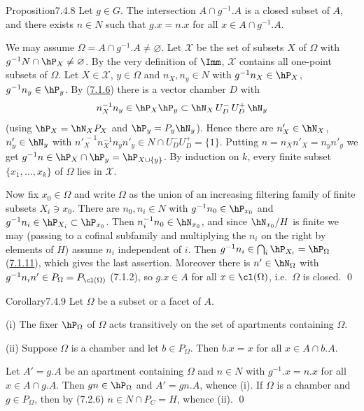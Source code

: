 \documentclass[12pt,a4paper,oneside,english]{smfart}
\makeatletter
\newcommand{\btanchor}[1]{\leavevmode\Hy@raisedlink{\hypertarget{bt:#1}{}}}
\newcommand{\btref}[1]{\hyperlink{bt:#1}{#1}}
\theoremstyle{definition}
\theoremstyle{bt}
\makeatother
\begin{document}
\begin{stmt}{Proposition}{7.4.8}\btanchor{7.4.8}
Let $g\in G$. The intersection $A\cap g^{-1}.A$ is a closed subset of $A$, and there
exists $n\in N$ such that $g.x=n.x$ for all $x\in A\cap g^{-1}.A$.
\end{stmt}

\pf We may assume $\Omega=A\cap g^{-1}.A\neq\varnothing$. Let $\mathscr{X}$ be the
set of subsets $X$ of $\Omega$ with $g^{-1}N\cap\hP_X\neq\varnothing$. By the very
definition of $\Imm$, $\mathscr{X}$ contains all one-point subsets of $\Omega$. Let
$X\in\mathscr{X}$, $y\in\Omega$ and $n_X,n_y\in N$ with $g^{-1}n_X\in\hP_X$,
$g^{-1}n_y\in\hP_y$. By (\btref{7.1.6}) there is a vector chamber $D$ with
\[
  n_X^{-1}n_y\in\hP_X\hP_y\subset\hN_X\,U_D^{-}\,U_D^{+}\,\hN_y
\]
(using $\hP_X=\hN_XP_X$ and $\hP_y=P_y\hN_y$). Hence there are
$n'_X\in\hN_X$, $n'_y\in\hN_y$ with
$n'^{\,-1}_Xn_X^{-1}n_yn'_y\in N\cap U_D^{-}U_D^{+}=\{1\}$. Putting
$n=n_Xn'_X=n_yn'_y$ we get $g^{-1}n\in\hP_X\cap\hP_y=\hP_{X\cup\{y\}}$. By induction
on $k$, every finite subset $\{x_1,\dots,x_k\}$ of $\Omega$ lies in $\mathscr{X}$.

Now fix $x_0\in\Omega$ and write $\Omega$ as the union of an increasing filtering
family of finite subsets $X_i\ni x_0$. There are $n_0,n_i\in N$ with
$g^{-1}n_0\in\hP_{x_0}$ and $g^{-1}n_i\in\hP_{X_i}\subset\hP_{x_0}$. Then
$n_i^{-1}n_0\in\hN_{x_0}$, and since $\hN_{x_0}/H$ is finite we may (passing to a
cofinal subfamily and multiplying the $n_i$ on the right by elements of $H$) assume
$n_i$ independent of $i$. Then $g^{-1}n_i\in\bigcap_i\hP_{X_i}=\hP_\Omega$ (\btref{7.1.11}),
which gives the last assertion. Moreover there is $n'\in\hN_\Omega$ with
$g^{-1}n_in'\in P_\Omega=P_{\cl(\Omega)}$ (7.1.2), so $g.x\in A$ for all
$x\in\cl(\Omega)$, i.e.\ $\Omega$ is closed. \qed

\begin{stmt}{Corollary}{7.4.9}\btanchor{7.4.9}
Let $\Omega$ be a subset or a facet of $A$.

(i) The fixer $\hP_\Omega$ of $\Omega$ acts transitively on the set of apartments
containing $\Omega$.

(ii) Suppose $\Omega$ is a chamber and let $b\in P_\Omega$. Then $b.x=x$ for all
$x\in A\cap b.A$.
\end{stmt}

\pf Let $A'=g.A$ be an apartment containing $\Omega$ and $n\in N$ with
$g^{-1}.x=n.x$ for all $x\in A\cap g.A$. Then $gn\in\hP_\Omega$ and $A'=gn.A$,
whence (i). If $\Omega$ is a chamber and $g\in P_\Omega$, then by (7.2.6)
$n\in N\cap P_C=H$, whence (ii). \qed
\end{document}

